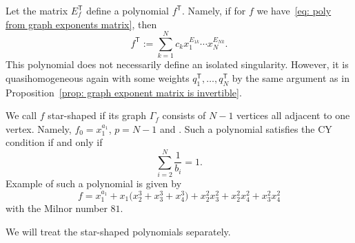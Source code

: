 \documentclass[10pt,a4paper]{amsart}
\numberwithin{equation}{section}
\begin{document}
Let the matrix $E_f^{\mathsf{T}}$ define a polynomial $f^{\mathsf{T}}$. Namely, if for $f$ we have~\eqref{eq: poly from graph exponents matrix}, then
\[
	f^{\mathsf{T}} := \sum_{k=1}^N c_k x_1^{E_{1k}} \cdots x_N^{E_{Nk}}.
\]
This polynomial does not necessarily define an isolated singularity. However, it is quasihomogeneous again with some weights $q_1^{\mathsf{T}}, \dots, q_N^{\mathsf{T}}$ by the same argument as in Proposition~\ref{prop: graph exponent matrix is invertible}.

We call $f$ star-shaped if its graph $\Gamma_f$ consists of $N-1$ vertices all adjacent to one vertex. Namely, $f_0 = x_1^{a_1}$, $p=N-1$ and . Such a polynomial satisfies the CY condition if and only if
\[
 \sum_{i=2}^N \frac{1}{b_i} = 1.
\]
Example of such a polynomial is given by
\[
 f = x_1^{a_1} + x_1 \bigl(x_2^3 +x_3^3 +x_4^3\bigr) + x_2^2x_3^2+ x_2^2x_4^2+ x_3^2x_4^2
\]
with the Milnor number $81$.

We will treat the star-shaped polynomials separately.
\end{document}

